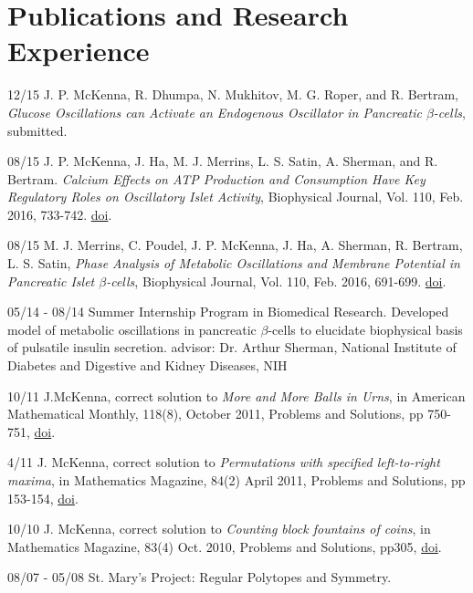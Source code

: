 \documentclass[a4paper]{article}
\begin{document}
\section{Publications and Research Experience}
\begin{CV}

\item [12/15] J. P. McKenna, R. Dhumpa, N. Mukhitov, M. G. Roper, and R. Bertram, {\it Glucose Oscillations can Activate an Endogenous Oscillator in Pancreatic $\beta$-cells}, submitted.
\item [08/15] J. P. McKenna, J. Ha, M. J. Merrins, L. S. Satin, A. Sherman, and R. Bertram. {\it Calcium Effects on ATP Production and Consumption Have Key Regulatory Roles on Oscillatory Islet Activity}, Biophysical Journal, Vol. 110, Feb. 2016, 733-742. \href{http://dx.doi.org/10.1016/j.bpj.2015.11.3526}{doi}.
\item [08/15] M. J. Merrins, C. Poudel, J. P. McKenna, J. Ha, A. Sherman, R. Bertram, L. S. Satin, {\it Phase Analysis of Metabolic Oscillations and Membrane Potential in Pancreatic Islet $\beta$-cells}, Biophysical Journal, Vol. 110, Feb. 2016, 691-699. \href{http://dx.doi.org/10.1016/j.bpj.2015.12.029}{doi}.
\item [05/14 - 08/14] Summer Internship Program in Biomedical Research. Developed model of metabolic oscillations in pancreatic $\beta$-cells to elucidate biophysical basis of pulsatile insulin secretion. advisor: Dr. Arthur Sherman, National Institute of Diabetes and Digestive and Kidney Diseases, NIH
\item [10/11] J.McKenna, correct solution to {\it More and More Balls in Urns}, in American Mathematical Monthly, 118(8), October 2011, Problems and Solutions, pp 750-751, \href{10.4169/amer.math.monthly.118.08.747}{doi}.  
\item [4/11]J. McKenna, correct solution to {\it Permutations with specified left-to-right maxima}, in Mathematics Magazine, 84(2) April 2011, Problems and Solutions, pp 153-154, \href{10.4169/math.mag.84.2.150}{doi}.
\item [10/10] J. McKenna, correct solution to {\it Counting block fountains of coins}, in Mathematics Magazine, 83(4) Oct. 2010, Problems and Solutions, pp305, \href{10.4169/002557010X521877}{doi}.
\item [08/07 - 05/08] St. Mary's Project: Regular Polytopes and Symmetry.
\end{CV}
\end{document}
